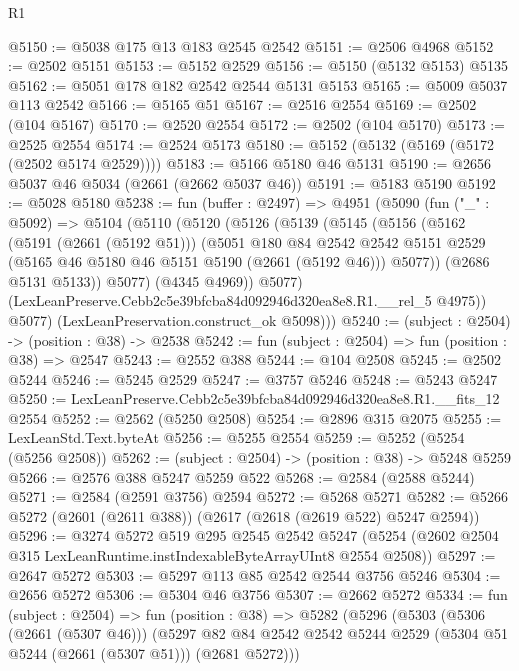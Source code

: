 \begin{lexlean}{R1}
\begin{coremodule}
@5150 := @5038 @175 @13 @183 @2545 @2542
@5151 := @2506 @4968
@5152 := @2502 @5151
@5153 := @5152 @2529
@5156 := @5150 (@5132 @5153) @5135
@5162 := @5051 @178 @182 @2542 @2544 @5131 @5153
@5165 := @5009 @5037 @113 @2542
@5166 := @5165 @51
@5167 := @2516 @2554
@5169 := @2502 (@104 @5167)
@5170 := @2520 @2554
@5172 := @2502 (@104 @5170)
@5173 := @2525 @2554
@5174 := @2524 @5173
@5180 := @5152 (@5132 (@5169 (@5172 (@2502 @5174 @2529))))
@5183 := @5166 @5180 @46 @5131
@5190 := @2656 @5037 @46 @5034 (@2661 (@2662 @5037 @46))
@5191 := @5183 @5190
@5192 := @5028 @5180
@5238 := fun (buffer : @2497) =>
  @4951
    (@5090
      (fun ("_" : @5092) =>
      @5104
        (@5110
          (@5120
            (@5126
              (@5139
                (@5145
                  (@5156
                    (@5162
                      (@5191 (@2661 (@5192 @51)))
                      (@5051
                        @180
                        @84
                        @2542
                        @2542
                        @5151
                        @2529
                        (@5165 @46 @5180 @46 @5151 @5190 (@2661 (@5192 @46)))
                        @5077))
                    (@2686 @5131 @5133))
                  @5077)
                (@4345 @4969))
              @5077)
            (LexLeanPreserve.Cebb2c5e39bfcba84d092946d320ea8e8.R1.__rel_5 @4975))
          @5077)
        (LexLeanPreservation.construct_ok @5098)))
@5240 := (subject : @2504) -> (position : @38) -> @2538
@5242 := fun (subject : @2504) => fun (position : @38) => @2547
@5243 := @2552 @388
@5244 := @104 @2508
@5245 := @2502 @5244
@5246 := @5245 @2529
@5247 := @3757 @5246
@5248 := @5243 @5247
@5250 := LexLeanPreserve.Cebb2c5e39bfcba84d092946d320ea8e8.R1.__fits_12 @2554
@5252 := @2562 (@5250 @2508)
@5254 := @2896 @315 @2075
@5255 := LexLeanStd.Text.byteAt
@5256 := @5255 @2554
@5259 := @5252 (@5254 (@5256 @2508))
@5262 := (subject : @2504) -> (position : @38) -> @5248 @5259
@5266 := @2576 @388 @5247 @5259 @522
@5268 := @2584 (@2588 @5244)
@5271 := @2584 (@2591 @3756) @2594
@5272 := @5268 @5271
@5282 := @5266 @5272 (@2601 (@2611 @388)) (@2617 (@2618 (@2619 @522) @5247 @2594))
@5296 := @3274
    @5272
    @519
    @295
    @2545
    @2542
    @5247
    (@5254 (@2602 @2504 @315 LexLeanRuntime.instIndexableByteArrayUInt8 @2554 @2508))
@5297 := @2647 @5272
@5303 := @5297 @113 @85 @2542 @2544 @3756 @5246
@5304 := @2656 @5272
@5306 := @5304 @46 @3756
@5307 := @2662 @5272
@5334 := fun (subject : @2504) =>
  fun (position : @38) =>
  @5282
    (@5296
      (@5303
        (@5306 (@2661 (@5307 @46)))
        (@5297 @82 @84 @2542 @2542 @5244 @2529 (@5304 @51 @5244 (@2661 (@5307 @51))) (@2681 @5272)))

\end{coremodule}
\end{lexlean}

